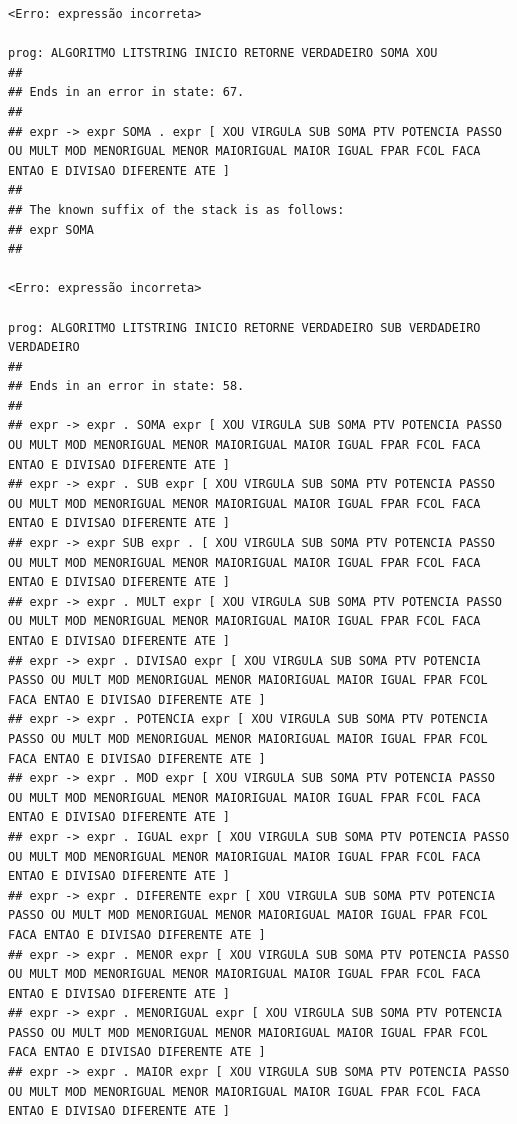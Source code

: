 \documentclass[hidelinks,12pt]{article}
\begin{document}
\begin{lstlisting}
<Erro: expressão incorreta>

prog: ALGORITMO LITSTRING INICIO RETORNE VERDADEIRO SOMA XOU 
##
## Ends in an error in state: 67.
##
## expr -> expr SOMA . expr [ XOU VIRGULA SUB SOMA PTV POTENCIA PASSO OU MULT MOD MENORIGUAL MENOR MAIORIGUAL MAIOR IGUAL FPAR FCOL FACA ENTAO E DIVISAO DIFERENTE ATE ]
##
## The known suffix of the stack is as follows:
## expr SOMA 
##

<Erro: expressão incorreta>

prog: ALGORITMO LITSTRING INICIO RETORNE VERDADEIRO SUB VERDADEIRO VERDADEIRO 
##
## Ends in an error in state: 58.
##
## expr -> expr . SOMA expr [ XOU VIRGULA SUB SOMA PTV POTENCIA PASSO OU MULT MOD MENORIGUAL MENOR MAIORIGUAL MAIOR IGUAL FPAR FCOL FACA ENTAO E DIVISAO DIFERENTE ATE ]
## expr -> expr . SUB expr [ XOU VIRGULA SUB SOMA PTV POTENCIA PASSO OU MULT MOD MENORIGUAL MENOR MAIORIGUAL MAIOR IGUAL FPAR FCOL FACA ENTAO E DIVISAO DIFERENTE ATE ]
## expr -> expr SUB expr . [ XOU VIRGULA SUB SOMA PTV POTENCIA PASSO OU MULT MOD MENORIGUAL MENOR MAIORIGUAL MAIOR IGUAL FPAR FCOL FACA ENTAO E DIVISAO DIFERENTE ATE ]
## expr -> expr . MULT expr [ XOU VIRGULA SUB SOMA PTV POTENCIA PASSO OU MULT MOD MENORIGUAL MENOR MAIORIGUAL MAIOR IGUAL FPAR FCOL FACA ENTAO E DIVISAO DIFERENTE ATE ]
## expr -> expr . DIVISAO expr [ XOU VIRGULA SUB SOMA PTV POTENCIA PASSO OU MULT MOD MENORIGUAL MENOR MAIORIGUAL MAIOR IGUAL FPAR FCOL FACA ENTAO E DIVISAO DIFERENTE ATE ]
## expr -> expr . POTENCIA expr [ XOU VIRGULA SUB SOMA PTV POTENCIA PASSO OU MULT MOD MENORIGUAL MENOR MAIORIGUAL MAIOR IGUAL FPAR FCOL FACA ENTAO E DIVISAO DIFERENTE ATE ]
## expr -> expr . MOD expr [ XOU VIRGULA SUB SOMA PTV POTENCIA PASSO OU MULT MOD MENORIGUAL MENOR MAIORIGUAL MAIOR IGUAL FPAR FCOL FACA ENTAO E DIVISAO DIFERENTE ATE ]
## expr -> expr . IGUAL expr [ XOU VIRGULA SUB SOMA PTV POTENCIA PASSO OU MULT MOD MENORIGUAL MENOR MAIORIGUAL MAIOR IGUAL FPAR FCOL FACA ENTAO E DIVISAO DIFERENTE ATE ]
## expr -> expr . DIFERENTE expr [ XOU VIRGULA SUB SOMA PTV POTENCIA PASSO OU MULT MOD MENORIGUAL MENOR MAIORIGUAL MAIOR IGUAL FPAR FCOL FACA ENTAO E DIVISAO DIFERENTE ATE ]
## expr -> expr . MENOR expr [ XOU VIRGULA SUB SOMA PTV POTENCIA PASSO OU MULT MOD MENORIGUAL MENOR MAIORIGUAL MAIOR IGUAL FPAR FCOL FACA ENTAO E DIVISAO DIFERENTE ATE ]
## expr -> expr . MENORIGUAL expr [ XOU VIRGULA SUB SOMA PTV POTENCIA PASSO OU MULT MOD MENORIGUAL MENOR MAIORIGUAL MAIOR IGUAL FPAR FCOL FACA ENTAO E DIVISAO DIFERENTE ATE ]
## expr -> expr . MAIOR expr [ XOU VIRGULA SUB SOMA PTV POTENCIA PASSO OU MULT MOD MENORIGUAL MENOR MAIORIGUAL MAIOR IGUAL FPAR FCOL FACA ENTAO E DIVISAO DIFERENTE ATE ]

\end{lstlisting}
\end{document}
